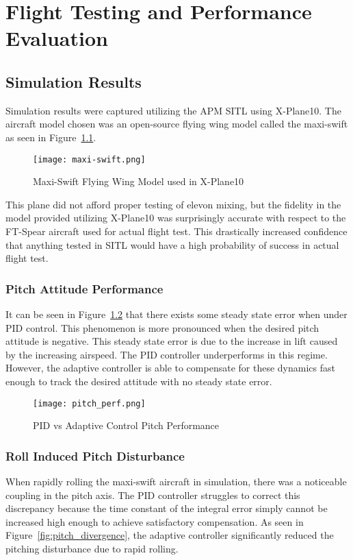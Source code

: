 \chapter{Flight Testing and Performance Evaluation}\label{ch:performance}

\section{Simulation Results}
Simulation results were captured utilizing the \ac{APM} \ac{SITL} using X-Plane10.  The aircraft model chosen was an open-source flying wing model called the maxi-swift as seen in Figure~\ref{fig:maxi-swift}.

\begin{figure}[!h]
 \centering
  \texttt{[image: maxi-swift.png]}
  \caption{Maxi-Swift Flying Wing Model used in X-Plane10}
  \label{fig:maxi-swift}
\end{figure}
This plane did not afford proper testing of elevon mixing, but the fidelity in the model provided utilizing X-Plane10 was surprisingly accurate with respect to the FT-Spear aircraft used for actual flight test.  This drastically increased confidence that anything tested in \ac{SITL} would have a high probability of success in actual flight test.


\subsection{Pitch Attitude Performance}

It can be seen in Figure~\ref{fig:pitch_perf} that there exists some steady state error when under \ac{PID} control.  This phenomenon is more pronounced when the desired pitch attitude is negative.  This steady state error is due to the increase in lift caused by the increasing airspeed.  The \ac{PID} controller underperforms in this regime.  However, the adaptive controller is able to compensate for these dynamics fast enough to track the desired attitude with no steady state error.

\begin{figure}[h!]
 \centering
  \texttt{[image: pitch\_perf.png]}
  \caption{PID vs \Lone Adaptive Control Pitch Performance}
  \label{fig:pitch_perf}
\end{figure}

\subsection{Roll Induced Pitch Disturbance}
When rapidly rolling the maxi-swift aircraft in simulation, there was a noticeable coupling in the pitch axis.  The \ac{PID} controller struggles to correct this discrepancy because the time constant of the integral error simply cannot be increased high enough to achieve satisfactory compensation.  As seen in Figure~\ref{fig:pitch_divergence}, the \Lone adaptive controller significantly reduced the pitching disturbance due to rapid rolling.

